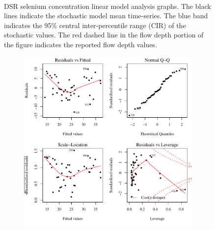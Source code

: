 \begin{landscape}
\begin{figure}
\begin{subfigure}{0.7\textwidth}
		\end{subfigure}\\
		\caption[DSR selenium concentration linear model analysis graphs.]{DSR selenium concentration linear model analysis graphs. The black lines indicate the stochastic model mean time-series.  The blue band indicates the 95\% central inter-percentile range (CIR) of the stochastic values.  The red dashed line in the flow depth portion of the figure indicates the reported flow depth values.}
		\label{fig:concLmFit_DS}
	\end{figure}
\end{landscape}

\subfiguremid
\begin{landscape}
	\begin{figure}
		\begin{subfigure}{0.7\textwidth}
			\centering
			\includegraphics[width=\tableCustomSize]{"Figures/Results_DSR/Stochastic/Conc Model lm-fit BIG"}
		\end{subfigure}%
		\begin{subfigure}{0.7\textwidth}
			\centering

\end{subfigure}
\end{figure}
\end{landscape}
